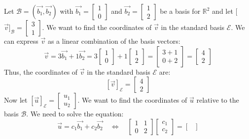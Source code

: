 \begin{eg}
    Let $\mathcal{B} = (\vec{b_1}, \vec{b_2})$ with $\vec{b_1} = \begin{bmatrix}1 \\ 0\end{bmatrix}$ and $\vec{b_2} = \begin{bmatrix}1 \\ 2\end{bmatrix}$ be a basis for $\mathbb{R}^2$ and let [$\vec{v}]_{\mathcal{B}} = \begin{bmatrix}
        3 \\ 1
    \end{bmatrix}$. We want to find the coordinates of $\vec{v}$ in the standard basis $\mathcal{E}$. We can express $\vec{v}$ as a linear combination of the basis vectors:
    \[ \vec{v} = 3\vec{b_1} + 1\vec{b_2} = 3\begin{bmatrix}1 \\ 0\end{bmatrix} + 1\begin{bmatrix}1 \\ 2\end{bmatrix} = \begin{bmatrix}
        3 + 1 \\ 0 + 2
    \end{bmatrix} = \begin{bmatrix}
        4 \\ 2
    \end{bmatrix} \]
    Thus, the coordinates of $\vec{v}$ in the standard basis $\mathcal{E}$ are:
    \[ [\vec{v}]_{\mathcal{E}} = \begin{bmatrix}
        4 \\ 2
    \end{bmatrix} \]
    Now let $[\vec{u}]_{\mathcal{E}} = \begin{bmatrix}
        u_1 \\ u_2
    \end{bmatrix}$. We want to find the coordinates of $\vec{u}$ relative to the basis $\mathcal{B}$. We need to solve the equation:
    \[ \vec{u} = c_1 \vec{b_1} + c_2 \vec{b_2} \quad \iff \quad  \begin{bmatrix}
        1 & 1 \\
        0 & 2
    \end{bmatrix} \begin{bmatrix}
        c_1 \\ c_2
    \end{bmatrix} = \begin{bmatrix}

\end{bmatrix}\]
\end{eg}
